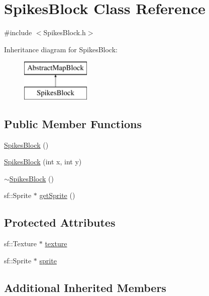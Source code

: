 \hypertarget{class_spikes_block}{}\section{Spikes\+Block Class Reference}
\label{class_spikes_block}


{\ttfamily \#include $<$Spikes\+Block.\+h$>$}

Inheritance diagram for Spikes\+Block\+:\begin{figure}[H]
\begin{center}
\leavevmode
\includegraphics[height=2.000000cm]{class_spikes_block}
\end{center}
\end{figure}
\subsection*{Public Member Functions}
\begin{DoxyCompactItemize}
\item 
\hyperlink{class_spikes_block_a01deb477eac15e0c173d47eca320377f}{Spikes\+Block} ()
\item 
\hyperlink{class_spikes_block_ae1ae23307e042a765a02bcf208df00a6}{Spikes\+Block} (int x, int y)
\item 
\hyperlink{class_spikes_block_a0f89c5c61dbdd9a8e69c6001c5b448c2}{$\sim$\+Spikes\+Block} ()
\item 
sf\+::\+Sprite $\ast$ \hyperlink{class_spikes_block_a01ee14c5a7053180abfc6620fbe1e3cd}{get\+Sprite} ()
\end{DoxyCompactItemize}
\subsection*{Protected Attributes}
\begin{DoxyCompactItemize}
\item 
sf\+::\+Texture $\ast$ \hyperlink{class_spikes_block_a0280cf45f757b2bf74f06394d7c51d28}{texture}
\item 
sf\+::\+Sprite $\ast$ \hyperlink{class_spikes_block_af553d7cee5570d44b0352a583e348a77}{sprite}
\end{DoxyCompactItemize}
\subsection*{Additional Inherited Members}


